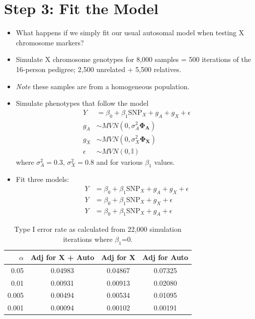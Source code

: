 \documentclass{beamer}
\begin{document}
\section{Step 3: Fit the Model}
\begin{frame}%
\begin{itemize}
\item What happens if we simply fit our usual autosomal model when testing X chromosome markers?
\end{itemize}
\end{frame}

\begin{frame}%
\small
\begin{itemize}
\item Simulate X chromosome genotypes for 8,000 samples = 500 iterations of the 16-person pedigree; 2,500 unrelated + 5,500 relatives.
\item \textit{Note} these samples are from a homogeneous population.
\item Simulate phenotypes that follow the model 
\begin{align*}
Y &= \beta_0 + \beta_1 \mbox{SNP}_X + g_A + g_X  +\epsilon\\
g_A &\sim MVN(0,\sigma^2_A \mathbf{\Phi_A}) \\
g_X &\sim MVN(0, \sigma^2_X \mathbf{\Phi_X}) \\
\epsilon &\sim MVN(0, \mathbb{I})
\end{align*}where $\sigma^2_A=0.3$, $\sigma^2_X=0.8$ and for various $\beta_1$ values.
\item Fit three models:
\begin{align*}
 Y &= \beta_0 + \beta_1 \mbox{SNP}_X + g_A + g_X +\epsilon\\
Y &= \beta_0 + \beta_1 \mbox{SNP}_X + g_X + \epsilon\\
Y &= \beta_0 + \beta_1 \mbox{SNP}_X  + g_A + \epsilon
\end{align*}
\end{itemize}
\end{frame}

\begin{frame}%
\begin{table}[ht]
\centering
\begin{tabular}{r|ccc}
  \hline
 $\alpha$ & Adj for X + Auto& Adj for X & Adj for Auto \\ 
  \hline
 0.05 & 0.04983 & 0.04867 & 0.07325 \\ 
 0.01 & 0.00931 & 0.00913 & 0.02080 \\ 
 0.005 & 0.00494 & 0.00534 & 0.01095 \\ 
 0.001 & 0.00094 & 0.00102 & 0.00191 \\ 
   \hline
\end{tabular}
\caption{Type I error rate as calculated from 22,000 simulation iterations where $\beta_1$=0.}
\end{table}
\end{frame}
\end{document}
